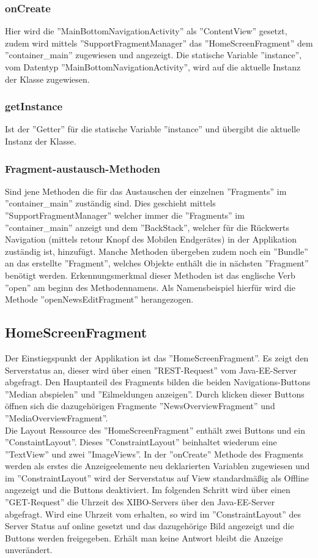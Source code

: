 \subsubsection{onCreate}
Hier wird die ''MainBottomNavigationActivity'' als ''ContentView'' gesetzt, zudem wird mittels ''SupportFragmentManager'' das ''HomeScreenFragment'' dem ''container\_main'' zugewiesen und angezeigt. Die statische Variable ''instance'', vom Datentyp ''MainBottomNavigationActivity'', wird auf die aktuelle Instanz der Klasse zugewiesen. 	
\subsubsection{getInstance}
 Ist der ''Getter'' für die statische Variable ''instance'' und übergibt die aktuelle Instanz der Klasse.
\subsubsection{Fragment-austausch-Methoden}
 Sind jene Methoden die für das Austauschen der einzelnen ''Fragments'' im ''container\_main'' zuständig sind. Dies geschieht mittels ''SupportFragmentManager'' welcher immer die ''Fragments'' im ''container\_main'' anzeigt und dem ''BackStack'', welcher für die Rückwerts Navigation (mittels retour Knopf des Mobilen Endgerätes) in der Applikation zuständig ist,  hinzufügt. Manche Methoden übergeben zudem noch ein ''Bundle'' an das erstellte ''Fragment'', welches Objekte enthält die in nächsten ''Fragment'' benötigt werden. Erkennungsmerkmal dieser Methoden ist das englische Verb ''open'' am beginn des Methodennamens. Als Namensbeispiel hierfür wird die Methode ''openNewsEditFragment'' herangezogen.
\subsection{HomeScreenFragment}
Der Einstiegspunkt der Applikation ist das ''HomeScreenFragment''. Es zeigt den Serverstatus an, dieser wird über einen ''REST-Request'' vom Java-EE-Server abgefragt. Den Hauptanteil des Fragments bilden die beiden Navigations-Buttons ''Median abspielen'' und ''Eilmeldungen anzeigen''. Durch klicken dieser Buttons öffnen sich die dazugehörigen Fragmente ''NewsOverviewFragment'' und ''MediaOverviewFragment''.
\\
Die Layout Ressource des ''HomeScreenFragment'' enthält zwei Buttons und ein ''ConstaintLayout''. Dieses ''ConstraintLayout'' beinhaltet wiederum eine ''TextView'' und zwei ''ImageViews''. In der ''onCreate'' Methode des Fragments werden als erstes die Anzeigeelemente neu deklarierten Variablen zugewiesen und im ''ConstraintLayout'' wird der Serverstatus auf View standardmäßig als Offline angezeigt und die Buttons deaktiviert. Im folgenden Schritt wird über einen ''GET-Request'' die Uhrzeit des XIBO-Servers über den Java-EE-Server abgefragt. Wird eine Uhrzeit vom erhalten, so wird im ''ConstraintLayout'' des Server Status auf online gesetzt und das dazugehörige Bild angezeigt und die Buttons werden freigegeben. Erhält man keine Antwort bleibt die Anzeige unverändert.
